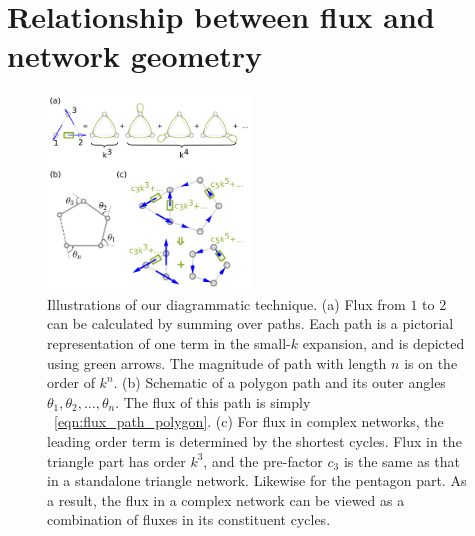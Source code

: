 \documentclass[
 preprint,
 preprintnumbers,
 amsmath,amssymb,
 aps,
 pre,
 longbibliography,
 superscriptaddress,
 10pt, twocolumn
]{revtex4-1}
\begin{document}
\section{Relationship between flux and network geometry} \label{sec:path}
\begin{figure}[tbp]
	\centering
	\includegraphics[width=0.48\textwidth]{path_sum.pdf}
    \caption{Illustrations of our diagrammatic technique.
    (a) Flux from $1$ to $2$ can be calculated by summing over paths. Each path is a pictorial representation of one term in the small-$k$ expansion, and is depicted using green arrows. The magnitude of path with length $n$ is on the order of $k^n$.
    (b) Schematic of a polygon path and its outer angles $\theta_1,\theta_2,\dots,\theta_n$. The flux of this path is simply \eqnname~\eqref{eqn:flux_path_polygon}.
    (c) For flux in complex networks, the leading order term is determined by the shortest cycles. Flux in the triangle part has order $k^3$, and the pre-factor $c_3$ is the same as that in a standalone triangle network. Likewise for the pentagon part. As a result, the flux in a complex network can be viewed as a combination of fluxes in its constituent cycles.
    }
    \label{fig:path_sum}
\end{figure}
\end{document}
